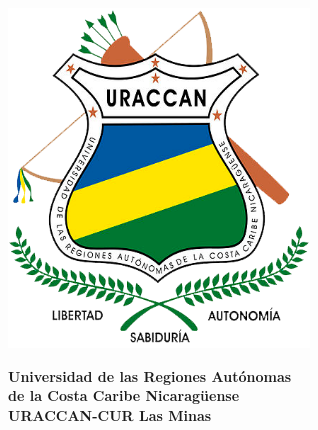 \begin{titlepage}
    \noindent
    \begin{minipage}{0.3\textwidth}
        \begin{center}
            \includegraphics[width=0.6\textwidth]{images/uraccan_logo.png}
        \end{center}
    \end{minipage}%
    \begin{minipage}{0.6\textwidth}
        \begin{center}
            \Large{\textbf{Universidad de las Regiones Autónomas\\de la Costa Caribe Nicaragüense}}\\
            \Large{\textbf{URACCAN-CUR Las Minas}}\\
        \end{center}
    \end{minipage}
\end{titlepage}